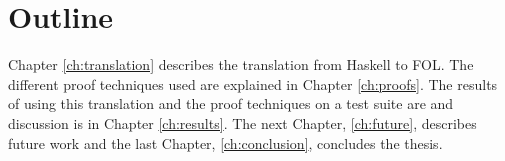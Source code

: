 
\section{Outline}

Chapter \ref{ch:translation} describes the translation from Haskell to
FOL. The different proof techniques used are explained in Chapter
\ref{ch:proofs}. The results of using this translation and the proof
techniques on a test suite are and discussion is in Chapter
\ref{ch:results}. The next Chapter, \ref{ch:future}, describes future
work and the last Chapter, \ref{ch:conclusion}, concludes the thesis.

